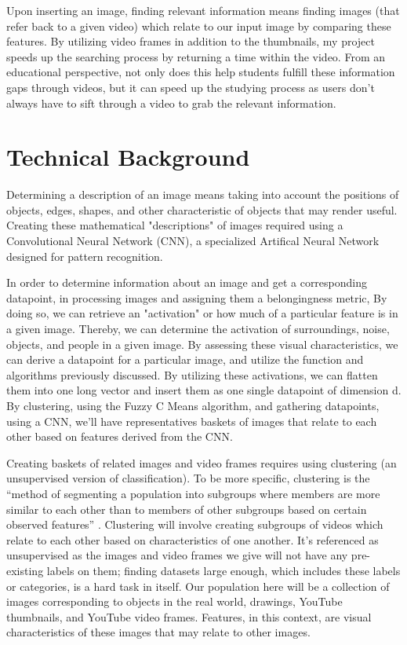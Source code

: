 \documentclass[10pt,twocolumn]{article}
\begin{document}
Upon inserting an image, finding relevant information means finding images (that refer back to a given video) which relate to our input image by comparing these features. By utilizing video frames in addition to the thumbnails, my project speeds up the searching process by returning a time within the video. From an educational perspective, not only does this help students fulfill these information gaps through videos, but it can speed up the studying process as users don’t always have to sift through a video to grab the relevant information.

\section{Technical Background} 

Determining a description of an image means taking into account the positions of objects, edges, shapes, and other characteristic of objects that may render useful. Creating these mathematical "descriptions" of images required using a Convolutional Neural Network (CNN), a specialized Artifical Neural Network designed for pattern recognition. 

In order to determine information about an image and get a corresponding datapoint, in processing images and assigning them a belongingness metric, By doing so, we can retrieve an "activation" or how much of a particular feature is in a given image. Thereby, we can determine the activation of surroundings, noise, objects, and people in a given image. By assessing these visual characteristics, we can derive a datapoint for a particular image, and utilize the function and algorithms previously discussed. By utilizing these activations, we can flatten them into one long vector and insert them as one single datapoint of dimension d. By clustering, using the Fuzzy C Means algorithm, and gathering datapoints, using a CNN, we'll have representatives baskets of images that relate to each other based on features derived from the CNN. 


Creating baskets of related images and video frames requires using clustering (an unsupervised version of classification). To be more specific, clustering is the “method of segmenting a population into subgroups where members are more similar to each other than to members of other subgroups based on certain observed features” \cite{C3Clustering}. Clustering will involve creating subgroups of videos which relate to each other based on characteristics of one another. It’s referenced as unsupervised as the images and video frames we give will not have any pre-existing labels on them; finding datasets large enough, which includes these labels or categories, is a hard task in itself. Our population here will be a collection of images corresponding to objects in the real world, drawings, YouTube thumbnails, and YouTube video frames. Features, in this context, are visual characteristics of these images that may relate to other images.
\end{document}
